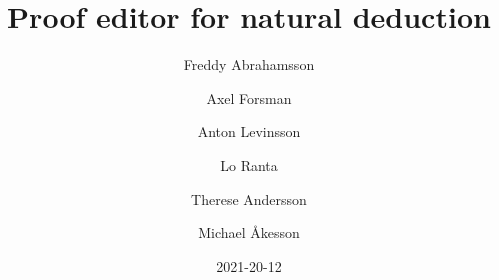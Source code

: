 \usepackage[T1]{fontenc}
\usepackage[utf8]{inputenc}
\usepackage[backend=biber, style=ieee]{biblatex}
\usepackage[colorlinks,allcolors=blue]{hyperref}
\usepackage{enumitem}



\setlength{\parindent}{0em}
\setlength{\parskip}{1em}

\title{Proof editor for natural deduction}
\date{2021-20-12}
\author{Freddy Abrahamsson \and
    Axel Forsman\and
    Anton Levinsson\and
    Lo Ranta\and
    Therese Andersson \and
    Michael Åkesson}